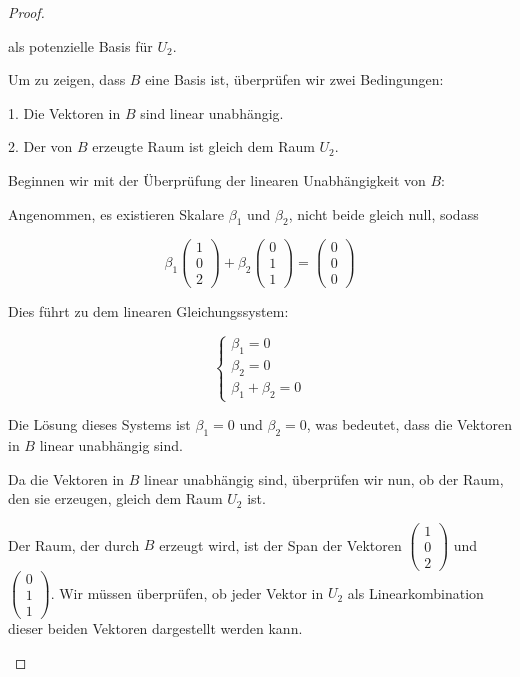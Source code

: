 \documentclass{../problemset}
\begin{document}
\begin{problem}
\begin{proof}
\begin{enumerate}
		      als potenzielle Basis für $U_2$.

		      Um zu zeigen, dass $B$ eine Basis ist, überprüfen wir zwei Bedingungen:

		      1. Die Vektoren in $B$ sind linear unabhängig.

		      2. Der von $B$ erzeugte Raum ist gleich dem Raum $U_2$.

		      Beginnen wir mit der Überprüfung der linearen Unabhängigkeit von $B$:

		      Angenommen, es existieren Skalare $\beta_1$ und $\beta_2$, nicht beide gleich null, sodass

		      \[
			      \beta_1 \begin{pmatrix} 1 \\ 0 \\ 2 \end{pmatrix} + \beta_2 \begin{pmatrix} 0 \\ 1 \\ 1 \end{pmatrix} = \begin{pmatrix} 0 \\ 0 \\ 0 \end{pmatrix}
		      \]

		      Dies führt zu dem linearen Gleichungssystem:

		      \[
			      \begin{cases}
				      \beta_1 = 0 \\
				      \beta_2 = 0 \\
				      \beta_1 + \beta_2 = 0
			      \end{cases}
		      \]

		      Die Lösung dieses Systems ist $\beta_1 = 0$ und $\beta_2 = 0$, was bedeutet, dass die Vektoren in $B$ linear unabhängig sind.

		      Da die Vektoren in $B$ linear unabhängig sind, überprüfen wir nun, ob der Raum, den sie erzeugen, gleich dem Raum $U_2$ ist.

		      Der Raum, der durch $B$ erzeugt wird, ist der Span der Vektoren $\begin{pmatrix} 1 \\ 0 \\ 2 \end{pmatrix}$ und $\begin{pmatrix} 0 \\ 1 \\ 1 \end{pmatrix}$. Wir müssen überprüfen, ob jeder Vektor in $U_2$ als Linearkombination dieser beiden Vektoren dargestellt werden kann.


\end{enumerate}
\end{proof}
\end{problem}
\end{document}
